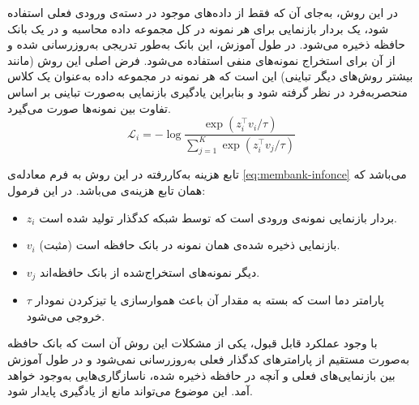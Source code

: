 در این روش، به‌جای آن که فقط از داده‌های موجود در دسته‌ی ورودی فعلی استفاده شود، یک بردار بازنمایی برای هر نمونه در کل مجموعه داده محاسبه و در یک بانک حافظه ذخیره می‌شود. در طول آموزش، این بانک به‌طور تدریجی به‌روزرسانی شده و از آن برای استخراج نمونه‌های منفی استفاده می‌شود. فرض اصلی این روش (مانند بیشتر روش‌های دیگر تباینی) این است که هر نمونه در مجموعه داده به‌عنوان یک کلاس منحصربه‌فرد در نظر گرفته شود و بنابراین یادگیری بازنمایی به‌صورت تباینی بر اساس تفاوت بین نمونه‌ها صورت می‌گیرد.
\begin{equation}
\label{eq:membank-infonce}
\mathcal{L}_i = -\log \frac{\exp(z_i^\top v_i / \tau)}{\sum_{j=1}^{K} \exp(z_i^\top v_j / \tau)}
\end{equation}

تابع هزینه به‌کاررفته در این روش به فرم معادله‌ی \ref{eq:membank-infonce}
می‌باشد که همان تابع هزینه‌ی 
می‌باشد. در این فرمول:
\begin{itemize}
    \item $z_i$ بردار بازنمایی نمونه‌ی ورودی است که توسط شبکه کدگذار تولید شده است.
    \item $v_i$ بازنمایی ذخیره شده‌ی همان نمونه در بانک حافظه است (مثبت).
    \item $v_j$ دیگر نمونه‌های استخراج‌شده از بانک حافظه‌اند.
    \item $\tau$ پارامتر دما است که بسته به مقدار آن باعث هموارسازی یا تیزکردن نمودار خروجی می‌شود.
\end{itemize}
با وجود عملکرد قابل قبول، یکی از مشکلات این روش آن است که بانک حافظه به‌صورت مستقیم از پارامترهای کدگذار فعلی به‌روزرسانی نمی‌شود و در طول آموزش بین بازنمایی‌های فعلی و آنچه در حافظه ذخیره شده، ناسازگاری‌هایی به‌وجود خواهد آمد. این موضوع می‌تواند مانع از یادگیری پایدار شود.

